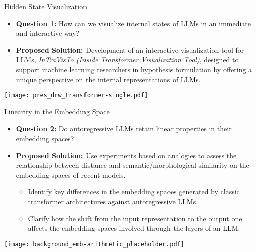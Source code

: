 \documentclass[aspectratio=169, 12pt, compress]{beamer}
\begin{document}
    \begin{frame}{Hidden State Visualization}
        \begin{minipage}{0.8\textwidth}
            \begin{itemize}[<+|visible@+->]
                \setlength\itemsep{0.6cm}
                \item \textbf{Question 1:} How can we visualize internal states of LLMs in an immediate and interactive way?
                \item \textbf{Proposed Solution:} Development of an interactive visualization tool for LLMs, \emph{InTraVisTo (Inside Transformer Visualization Tool)}, designed to support machine learning researchers in hypothesis formulation by offering a unique perspective on the internal representations of LLMs.
            \end{itemize}
        \end{minipage}%
        \begin{minipage}{0.2\textwidth}
            \centering%
            \texttt{[image: pres\_drw\_transformer-single.pdf]}%
        \end{minipage}%
    \end{frame}

    \begin{frame}{Linearity in the Embedding Space}
        \begin{minipage}{0.8\textwidth}
            \begin{itemize}[<+|visible@+->]
                \item<1-1> \textbf{Question 2:} Do autoregressive LLMs retain linear properties in their embedding spaces?
                \item<2-3> \textbf{Proposed Solution:} Use experiments based on analogies to assess the relationship between distance and semantic/morphological similarity on the embedding spaces of recent models.
                \begin{itemize}[<+|visible@+->]
                    \item<3-3> Identify key differences in the embedding spaces generated by classic transformer architectures against autoregressive LLMs.
                    \item<3-3> Clarify how the shift from the input representation to the output one affects the embedding spaces involved through the layers of an LLM.
                \end{itemize}
            \end{itemize}
        \end{minipage}%
        \begin{minipage}{0.2\textwidth}
            \centering%
            \texttt{[image: background\_emb-arithmetic\_placeholder.pdf]}%
        \end{minipage}%
    \end{frame}
\end{document}
